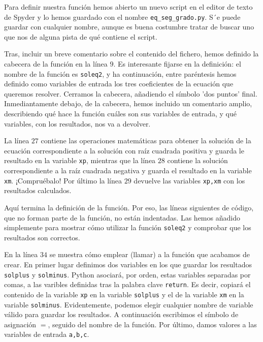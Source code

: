 \begin{paracol}{2}
    Para definir nuestra función hemos abierto un nuevo script en el editor de texto de Spyder y lo hemos guardado con el nombre \texttt{eq\_seg\_grado.py}. S´e puede guardar con cualquier nombre, aunque es buena costumbre tratar de buscar uno que nos de alguna pista de qué contiene el script.

    Tras, incluir un breve comentario sobre el contenido del fichero, hemos definido la cabecera de la función en la línea $9$. Es interesante fijarse en la definición: el nombre de la función es \texttt{soleq2}, y ha continuación, entre paréntesis hemos definido como variables de entrada los tres coeficientes de la ecuación que queremos resolver. Cerramos la cabecera, añadiendo el símbolo 'dos puntos' final. Inmediantamente debajo, de la cabecera, hemos incluido un comentario amplio, describiendo qué hace la función cuáles son sus variables de entrada, y qué variables, con los resultados, nos va a devolver.

    La línea $27$ contiene las operaciones matemáticas para obtener la solución de la ecuación correspondiente a la solución con raíz cuadrada positiva y guarda le resultado en la variable \texttt{xp}, mientras que la línea $28$ contiene la solución  correspondiente a la raíz cuadrada negativa y guarda el resultado en la variable \texttt{xm}. ¡Compruébalo!
    Por último la línea $29$ devuelve las variables \texttt{xp,xm} con los resultados calculados.

    Aquí termina la definición de la función. Por eso, las líneas siguientes de código, que no forman parte de la función, no están indentadas. Las hemos añadido simplemente para mostrar cómo utilizar la función \texttt{soleq2} y comprobar que los resultados son correctos.

    En la línea $34$ se muestra cómo emplear (llamar) a la función que acabamos de crear. En primer lugar definimos dos variables en los que guardar los resultados \texttt{solplus} y \texttt{solminus}. Python asociará, por orden, estas variables separadas por comas, a las varibles definidas tras la palabra clave \texttt{return}. Es decir, copiará el contenido de la variable \texttt{xp} en la variable \texttt{solplus} y el de la variable \texttt{xm} en la variable \texttt{solminus}. Evidentemente, podemos elegir cualquier nombre de variable válido para guardar los resultados. A continuación escribimos el símbolo de asignación $=$, seguido del nombre de la función. Por último, damos valores a las variables de entrada \texttt{a,b,c}.


\end{paracol}
